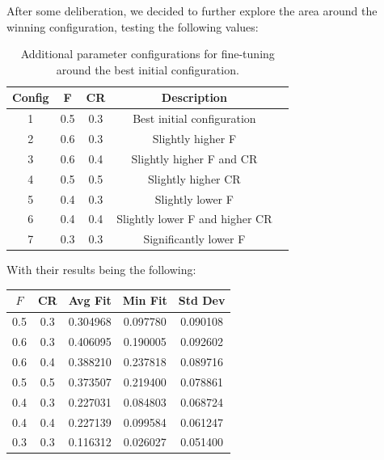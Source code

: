 \documentclass[12pt,a4paper]{article}
\begin{document}
\begin{itemize}
        After some deliberation, we decided to further explore the area around the winning configuration, testing the following values:
         \begin{table}[H]
                \centering
                \begin{tabular}{c c c c l}
                \hline
                \textbf{Config} & \textbf{F} & \textbf{CR} & \textbf{Description} \\
                \hline
                    1 & 0.5 & 0.3 & Best initial configuration \\
                    2 & 0.6 & 0.3 & Slightly higher F \\
                    3 & 0.6 & 0.4 & Slightly higher F and CR \\
                    4 & 0.5 & 0.5 & Slightly higher CR \\
                    5 & 0.4 & 0.3 & Slightly lower F \\
                    6 & 0.4 & 0.4 & Slightly lower F and higher CR \\
                    7 & 0.3 & 0.3 & Significantly lower F \\
                \hline
                \end{tabular}
                \caption{Additional parameter configurations for fine-tuning around the best initial configuration.}
            \end{table}
        
       
        With their results being the following:
            
          

        \begin{table}[H]
        \centering
            \begin{tabular}{c c c c c}
            \hline
            $F$ & CR & Avg Fit & Min Fit & Std Dev \\
            \hline
            0.5 & 0.3 & 0.304968 & 0.097780 & 0.090108 \\
            0.6 & 0.3 & 0.406095 & 0.190005 & 0.092602 \\
            0.6 & 0.4 & 0.388210 & 0.237818 & 0.089716 \\
            0.5 & 0.5 & 0.373507 & 0.219400 & 0.078861 \\
            0.4 & 0.3 & 0.227031 & 0.084803 & 0.068724 \\
            0.4 & 0.4 & 0.227139 & 0.099584 & 0.061247 \\
            0.3 & 0.3 & 0.116312 & 0.026027 & 0.051400 \\
            \hline
            \end{tabular}


\end{table}
\end{itemize}
\end{document}
